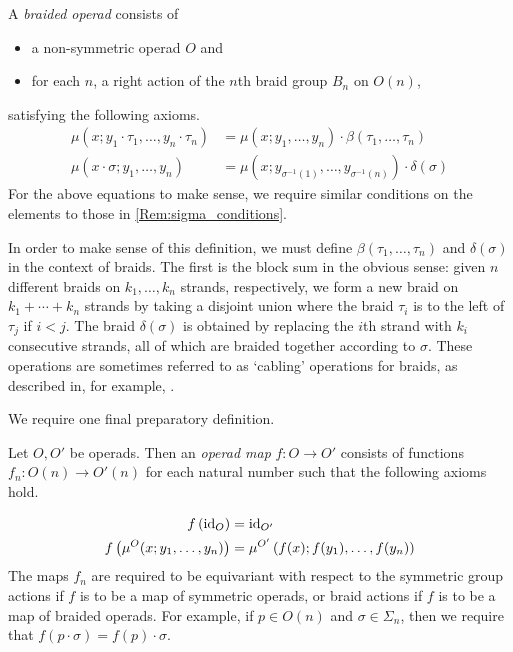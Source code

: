 \begin{Defi}\label{broperad}
A \textit{braided operad} consists of
  \begin{itemize}
    \item a non-symmetric operad $O$ and
    \item for each $n$, a right action of the $n$th braid group $B_{n}$ on $O(n)$,
  \end{itemize}
satisfying the following axioms.
  \begin{align*}
    \mu(x;y_1 \cdot \tau_1,\ldots,y_n \cdot \tau_n) &= \mu(x;y_1,\ldots,y_n)\cdot\beta(\tau_1,\ldots,\tau_n)\\
    \mu(x \cdot \sigma; y_1, \ldots, y_n) &= \mu\left(x;y_{\sigma^{-1}(1)},\ldots,y_{\sigma^{-1}(n)}\right)\cdot \delta(\sigma)
  \end{align*}
For the above equations to make sense, we require similar conditions on the elements to those in \cref{Rem:sigma_conditions}.
\end{Defi}

In order to make sense of this definition, we must define $\beta(\tau_1,\ldots,\tau_n)$ and $\delta(\sigma)$ in the context of braids. The first is the block sum in the obvious sense:  given $n$ different braids on $k_{1}, \ldots, k_{n}$ strands, respectively, we form a new braid on $k_{1} + \cdots + k_{n}$ strands by taking a disjoint union where the braid $\tau_{i}$ is to the left of $\tau_{j}$ if $i < j$. The braid $\delta(\sigma)$ is obtained by replacing the $i$th strand with $k_{i}$ consecutive strands, all of which are braided together according to $\sigma$. These operations are sometimes referred to as `cabling' operations for braids, as described in, for example, \cite{doucot_local_2025}.

We require one final preparatory definition.

\begin{Defi}\label{Defi:op_map}
Let $O,O'$ be operads. Then an \textit{operad map} $f \colon O \rightarrow O'$ consists of functions $f_{n} \colon O(n) \rightarrow O'(n)$ for each natural number such that the following axioms hold.

  \begin{align*}
    f\left(\textrm{id}_O\right) &= \textrm{id}_{O'}\\
    f\left(\mu^{O}(x;y_1,\ldots,y_n)\right) &= \mu^{O'}\left(f(x);f(y_1),\ldots,f(y_n)\right)
  \end{align*}
The maps $f_{n}$ are required to be equivariant with respect to the symmetric group actions if $f$ is to be a map of symmetric operads, or braid actions if $f$ is to be a map of braided operads. For example, if $p \in O(n)$ and $\sigma \in \Sigma_n$, then we require that $f(p \cdot \sigma) = f(p) \cdot \sigma$.
\end{Defi}


